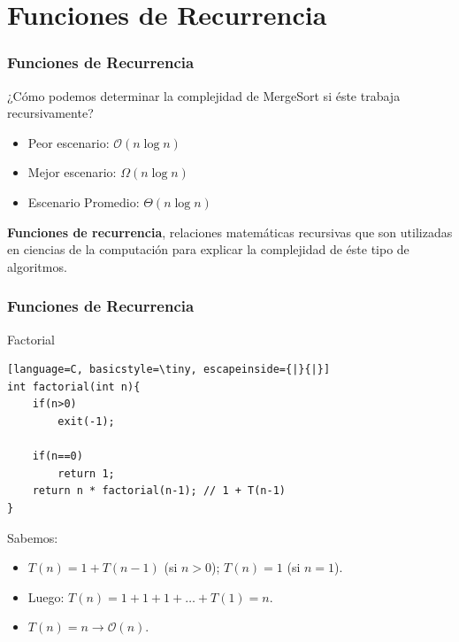 \documentclass{beamer}
\begin{document}
\section{Funciones de Recurrencia}
\begin{frame}[fragile]
 \frametitle{Funciones de Recurrencia}
\small
¿Cómo podemos determinar la complejidad de MergeSort si éste trabaja recursivamente?
\begin{itemize}
\item Peor escenario: $\mathcal{O}(n \log n)$
\item Mejor escenario: $\Omega(n \log n)$
\item Escenario Promedio: $\Theta(n \log n)$
\end{itemize}

\textbf{Funciones de recurrencia}, relaciones matemáticas recursivas que son utilizadas en ciencias de la computación para explicar la complejidad de éste tipo de algoritmos.
\end{frame}

\begin{frame}[fragile]
 \frametitle{Funciones de Recurrencia}
\small
\begin{exampleblock}{Factorial}
\begin{lstlisting}[language=C, basicstyle=\tiny, escapeinside={|}{|}]
int factorial(int n){
	if(n>0)
		exit(-1);

	if(n==0)
		return 1;
	return n * factorial(n-1); // 1 + T(n-1)
}
\end{lstlisting}
\end{exampleblock}

Sabemos:
\begin{itemize}
\item $T(n) = 1 + T(n-1)$ (si $n > 0$); $T(n) = 1$ (si $n = 1$).
\item Luego: $T(n) = 1 + 1 + 1 + \dots + T(1) = n$.\pause
\item $T(n) = n \rightarrow \mathcal{O}(n)$.
\end{itemize}
\end{frame}
\end{document}
